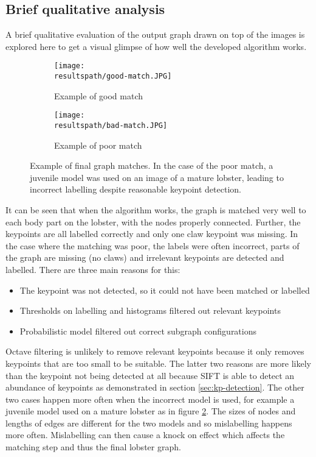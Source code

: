 \subsection{Brief qualitative analysis}
A brief qualitative evaluation of the output graph drawn on top of the images is explored here to get a visual glimpse of how well the developed algorithm works.
\begin{figure}[H]
	\begin{subfigure}{0.45\textwidth}
	\texttt{[image: \\resultspath/good-match.JPG]}
	\caption{Example of good match}
	\end{subfigure}
	\hspace*{\fill}
	\begin{subfigure}{0.45\textwidth}
	\texttt{[image: \\resultspath/bad-match.JPG]}
	\caption{Example of poor match}
	\label{fig:poor-match}
	\end{subfigure}
\caption{Example of final graph matches. In the case of the poor match, a juvenile model was used on an image of a mature lobster, leading to incorrect labelling despite reasonable keypoint detection.}
\end{figure}
\noindent
It can be seen that when the algorithm works, the graph is matched very well to each body part on the lobster, with the nodes properly connected. Further, the keypoints are all labelled correctly and only one claw keypoint was missing. In the case where the matching was poor, the labels were often incorrect, parts of the graph are missing (no claws) and irrelevant keypoints are detected and labelled. There are three main reasons for this:
\begin{itemize}
\item The keypoint was not detected, so it could not have been matched or labelled
\item Thresholds on labelling and histograms filtered out relevant keypoints
\item Probabilistic model filtered out correct subgraph configurations 
\end{itemize}
Octave filtering is unlikely to remove relevant keypoints because it only removes keypoints that are too small to be suitable. The latter two reasons are more likely than the keypoint not being detected at all because SIFT is able to detect an abundance of keypoints as demonstrated in section \ref{sec:kp-detection}. The other two cases happen more often when the incorrect model is used, for example a juvenile model used on a mature lobster as in figure \ref{fig:poor-match}. The sizes of nodes and lengths of edges are different for the two models and so mislabelling happens more often. Mislabelling can then cause a knock on effect which affects the matching step and thus the final lobster graph. 

